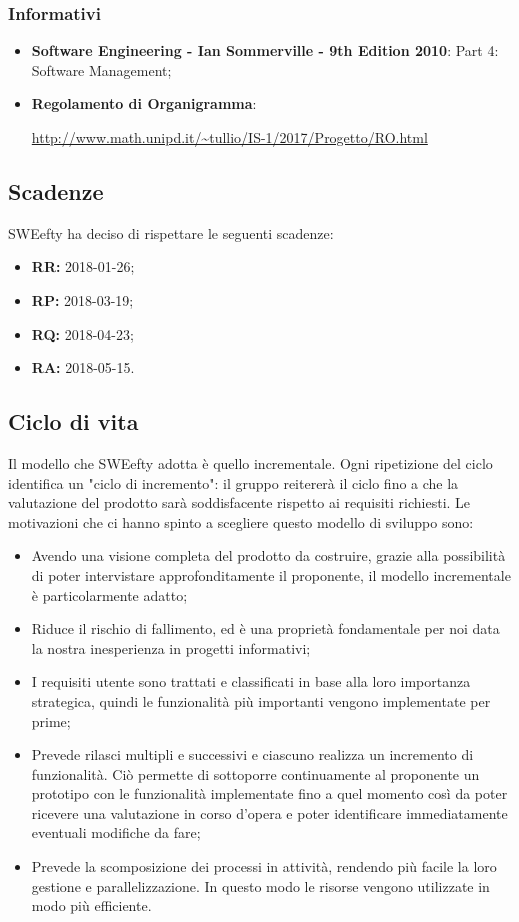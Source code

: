 			\subsubsection{Informativi}
			\begin{itemize}
				\item \textbf{Software Engineering - Ian Sommerville - 9th Edition 2010}:  Part 4: Software Management;
				\item \textbf{Regolamento di Organigramma}: \par
				\url{http://www.math.unipd.it/~tullio/IS-1/2017/Progetto/RO.html}
			\end{itemize}
			
	\subsection{Scadenze}
	\label{scadenze}
	SWEefty ha deciso di rispettare le seguenti scadenze:
	\begin{itemize}
		\item \textbf{RR:} 2018-01-26;
		\item \textbf{RP:} 2018-03-19;
		\item \textbf{RQ:} 2018-04-23;
		\item \textbf{RA:} 2018-05-15.
	\end{itemize}
	\subsection{Ciclo di vita}	
	Il modello che SWEefty adotta è quello incrementale. Ogni ripetizione del ciclo identifica un "ciclo di incremento": il gruppo reitererà il ciclo fino a che la valutazione del prodotto sarà soddisfacente rispetto ai requisiti richiesti.
	Le motivazioni che ci hanno spinto a scegliere questo modello di sviluppo sono:
	\begin{itemize}
		\item Avendo una visione completa del prodotto da costruire, grazie alla possibilità di poter intervistare approfonditamente il proponente, il modello incrementale è particolarmente adatto;
		\item Riduce il rischio di fallimento, ed è una proprietà fondamentale per noi data la nostra inesperienza in progetti informativi;
		\item I requisiti utente sono trattati e classificati in base alla loro importanza strategica, quindi le funzionalità più importanti vengono implementate per prime;
		\item Prevede rilasci multipli e successivi e ciascuno realizza un incremento di funzionalità. Ciò permette di sottoporre continuamente al proponente un prototipo con le funzionalità implementate fino a quel momento così da poter ricevere una valutazione in corso d'opera e poter identificare immediatamente eventuali modifiche da fare;
		\item Prevede la scomposizione dei processi in attività, rendendo più facile la loro gestione e parallelizzazione. In questo modo le risorse vengono utilizzate in modo più efficiente.
	\end{itemize}
